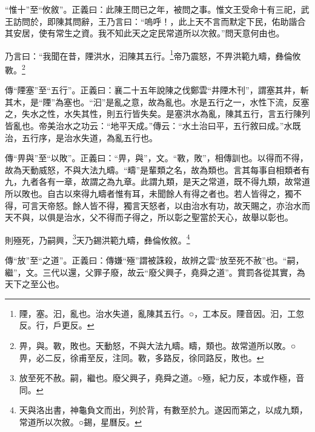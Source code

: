 {\noindent\shu{}\fzkt “惟十”至“攸敘”。正義曰：此陳王問已之年，被問之事。惟文王受命十有三祀，武王訪問於，即陳其問辭，王乃言曰：“嗚呼！，此上天不言而默定下民，佑助諧合其安居，使有常生之資。我不知此天之定民常道所以次敘。”問天意何由也。 \par}

乃言曰：“我聞在昔，陻洪水，汩陳其五行。\footnote{陻，塞。汩，亂也。治水失道，亂陳其五行。○，工本反。陻音因。汩，工忽反。行，戶更反。}帝乃震怒，不畀洪範九疇，彝倫攸斁。\footnote{畀，與。斁，敗也。天動怒，不與大法九疇。疇，類也。故常道所以敗。○畀，必二反，徐甫至反，注同。斁，多路反，徐同路反，敗也。}


{\noindent\zhuan{}\fzbyks 傳“陻塞”至“五行”。正義曰：襄二十五年說陳之伐鄭雲“井陻木刊”，謂塞其井，斬其木，是“陻”為塞也。“汩”是亂之意，故為亂也。水是五行之一，水性下流，反塞之，失水之性，水失其性，則五行皆失矣。是塞洪水為亂，陳其五行，言五行陳列皆亂也。帝美治水之功云：“地平天成。”傳云：“水土治曰平，五行敘曰成。”水既治，五行序，是治水失道，為亂五行也。 \par}

{\noindent\zhuan{}\fzbyks 傳“畀與”至“以敗”。正義曰：“畀，與”，文。“斁，敗”，相傳訓也。以得而不得，故為天動威怒，不與大法九疇。“疇”是輩類之名，故為類也。言其每事自相類者有九，九者各有一章，故謂之為九章。此謂九類，是天之常道，既不得九類，故常道所以敗也。自古以來得九疇者惟有耳，未聞餘人有得之者也。若人皆得之，獨不得，可言天帝怒。餘人皆不得，獨言天怒者，以由治水有功，故天賜之，亦治水而天不與，以俱是治水，父不得而子得之，所以彰之聖當於天心，故舉以彰也。 \par}

則殛死，乃嗣興，\footnote{放至死不赦。嗣，繼也。廢父興子，堯舜之道。○殛，紀力反，本或作極，音同。}天乃錫洪範九疇，彝倫攸敘。\footnote{天與洛出書，神龜負文而出，列於背，有數至於九。遂因而第之，以成九類，常道所以次敘。○錫，星曆反。}

{\noindent\zhuan{}\fzbyks 傳“放”至“之道”。正義曰：傳嫌“殛”謂被誅殺，故辨之雲“放至死不赦”也。“嗣，繼”，文。三代以還，父罪子廢，故云“廢父興子，堯舜之道”。賞罰各從其實，為天下之至公也。 \par}

